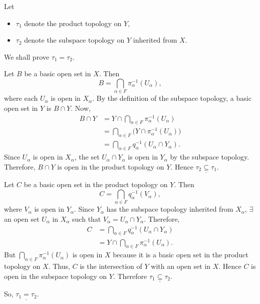 
Let
\begin{itemize}
  \item $\tau_1$ denote the product topology on $Y$,
  \item $\tau_2$ denote the subspace topology on $Y$ inherited from $X$.
\end{itemize}
We shall prove $\tau_1=\tau_2$.

Let $B$ be a basic open set in $X$. Then
\[ B=\bigcap_{\alpha\in F}\pi_\alpha^{-1}(U_\alpha), \]
where each $U_\alpha$ is open in $X_\alpha$. By the definition of the subspace topology, a
basic open set in $Y$ is $B\cap Y$. Now,
\begin{align*}
  B\cap Y &= Y\cap\bigcap_{\alpha\in F}\pi_\alpha^{-1}(U_\alpha)\\
          &= \bigcap_{\alpha\in F}\bigl(Y\cap\pi_\alpha^{-1}(U_\alpha)\bigr)\\
          &= \bigcap_{\alpha\in F}q_\alpha^{-1}(U_\alpha\cap Y_\alpha).
\end{align*}
Since $U_\alpha$ is open in $X_\alpha$, the set $U_\alpha\cap Y_\alpha$ is open in $Y_\alpha$ by
the subspace topology. Therefore, $B\cap Y$ is open in the product topology on $Y$. Hence
$\underline{\tau_2\subseteq\tau_1}$.

Let $C$ be a basic open set in the product topology on $Y$. Then
\[ C=\bigcap_{\alpha\in F}q_\alpha^{-1}(V_\alpha), \]
where $V_\alpha$ is open in $Y_\alpha$. Since $Y_\alpha$ has the subspace topology inherited
from $X_\alpha$, $\exists$ an open set $U_\alpha$ in $X_\alpha$ such that
$V_\alpha=U_\alpha\cap Y_\alpha$. Therefore,
\begin{align*}
  C &= \bigcap_{\alpha\in F}q_\alpha^{-1}(U_\alpha\cap Y_\alpha)\\
    &= Y\cap\bigcap_{\alpha\in F}\pi_\alpha^{-1}(U_\alpha).
\end{align*}
But $\bigcap_{\alpha\in F}\pi_\alpha^{-1}(U_\alpha)$ is open in $X$ because it is a basic open
set in the product topology on $X$. Thus, $C$ is the intersection of $Y$ with an open set in
$X$. Hence $C$ is open in the subspace topology on $Y$. Therefore
$\underline{\tau_1\subseteq\tau_2}$.

So, $\underline{\tau_1=\tau_2}$.
